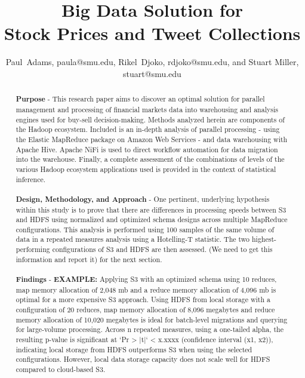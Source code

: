 \documentclass[journal]{IEEEtran}
\begin{document}
\title{Big Data Solution for\\ Stock Prices and Tweet Collections}

\author{Paul~Adams, paula@smu.edu,
        Rikel~Djoko, rdjoko@smu.edu,
        and Stuart Miller, stuart@smu.edu}%


\maketitle

\begin{abstract}
\textbf{Purpose} - This research paper aims to discover an optimal solution for parallel management and processing of financial markets data into  warehousing and analysis engines used for buy-sell decision-making. Methods analyzed herein are components of the Hadoop ecosystem. Included is an in-depth analysis of parallel processing - using the Elastic MapReduce package on Amazon Web Services - and data warehousing with Apache Hive. Apache NiFi is used to direct workflow automation for data migration into the warehouse. Finally, a complete assessment of the combinations of levels of the various Hadoop ecosystem applications used is provided in the context of statistical inference.
\\
\\
\textbf{Design, Methodology, and Approach} - One pertinent, underlying hypothesis within this study is to prove that there are differences in processing speeds between S3 and HDFS using normalized and optimized schema designs across multiple MapReduce configurations. This analysis is performed using 100 samples of the same volume of data in a repeated measures analysis using a Hotelling-T statistic. The two highest-performing configurations of S3 and HDFS are then assessed. (We need to get this information and report it) for the next section.
\\
\\
\textbf{Findings} - \textbf{EXAMPLE:} Applying S3 with an optimized schema using 10 reduces, map memory allocation of 2,048 mb and a reduce memory allocation of 4,096 mb is optimal for a more expensive S3 approach. Using HDFS from local storage with a configuration of 20 reduces, map memory allocation of 8,096 megabytes and reduce memory allocation of 10,020 megabytes is ideal for batch-level migrations and querying for large-volume processing. Across n repeated measures, using a one-tailed alpha, the resulting p-value is significant at `Pr > |t|` < x.xxxx (confidence interval (x1, x2)), indicating local storage from HDFS outperforms S3 when using the selected configurations. However, local data storage capacity does not scale well for HDFS compared to cloud-based S3.
\end{abstract}
\end{document}
